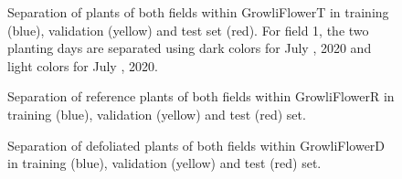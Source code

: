 \documentclass{article}
\begin{document}
\begin{appendices}
\begin{figure}[h]
	\centering
    \caption{Separation of plants of both fields within GrowliFlowerT in training (blue), validation (yellow) and test set (red).
    For field 1, the two planting days are separated using dark colors for July , 2020 and light colors for July , 2020.
    }
	\label{fig:random_TrainValTest}
\end{figure}



\begin{figure}
    \centering
    \caption{Separation of reference plants of both fields within GrowliFlowerR in training (blue), validation (yellow) and test (red) set.}
    \label{fig:reference_map_trainValTest}
\end{figure}


\begin{figure}
    \centering
    \caption{Separation of defoliated plants of both fields within GrowliFlowerD in training (blue), validation (yellow) and test (red) set.}
    \label{fig:defoliation_map_trainValTest}
\end{figure}

\end{appendices}
\end{document}
